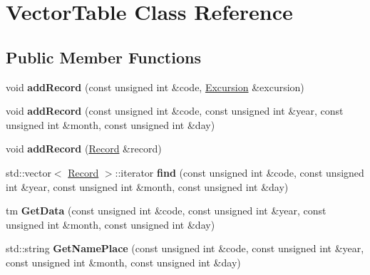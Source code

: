 \hypertarget{class_vector_table}{}\section{Vector\+Table Class Reference}
\label{class_vector_table}
\subsection*{Public Member Functions}
\begin{DoxyCompactItemize}
\item 
\hypertarget{class_vector_table_a4fcace919113d3adfb809695ea13316d}{}void {\bfseries add\+Record} (const unsigned int \&code, \hyperlink{class_excursion}{Excursion} \&excursion)\label{class_vector_table_a4fcace919113d3adfb809695ea13316d}

\item 
\hypertarget{class_vector_table_a9e4807907bde24f1117cc145c205ce6f}{}void {\bfseries add\+Record} (const unsigned int \&code, const unsigned int \&year, const unsigned int \&month, const unsigned int \&day)\label{class_vector_table_a9e4807907bde24f1117cc145c205ce6f}

\item 
\hypertarget{class_vector_table_a51660a0ee1126898067435ef3f17f52c}{}void {\bfseries add\+Record} (\hyperlink{struct_record}{Record} \&record)\label{class_vector_table_a51660a0ee1126898067435ef3f17f52c}

\item 
\hypertarget{class_vector_table_a98a31837b266e9b6b1f579e5e13b2dbc}{}std\+::vector$<$ \hyperlink{struct_record}{Record} $>$\+::iterator {\bfseries find} (const unsigned int \&code, const unsigned int \&year, const unsigned int \&month, const unsigned int \&day)\label{class_vector_table_a98a31837b266e9b6b1f579e5e13b2dbc}

\item 
\hypertarget{class_vector_table_ab0917cb01c58ed061168946beb8e61aa}{}tm {\bfseries Get\+Data} (const unsigned int \&code, const unsigned int \&year, const unsigned int \&month, const unsigned int \&day)\label{class_vector_table_ab0917cb01c58ed061168946beb8e61aa}

\item 
\hypertarget{class_vector_table_a5f144bd1ef44deaa83f981c14434fbe8}{}std\+::string {\bfseries Get\+Name\+Place} (const unsigned int \&code, const unsigned int \&year, const unsigned int \&month, const unsigned int \&day)\label{class_vector_table_a5f144bd1ef44deaa83f981c14434fbe8}


\end{DoxyCompactItemize}

